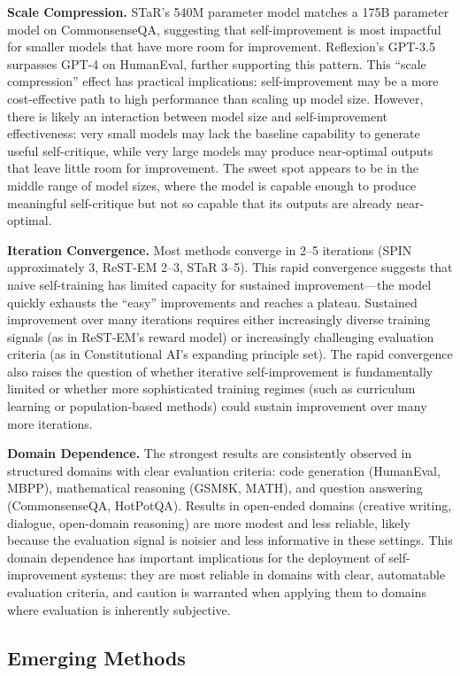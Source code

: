 \textbf{Scale Compression.} STaR's 540M parameter model matches a 175B parameter model on CommonsenseQA, suggesting that self-improvement is most impactful for smaller models that have more room for improvement. Reflexion's GPT-3.5 surpasses GPT-4 on HumanEval, further supporting this pattern. This ``scale compression'' effect has practical implications: self-improvement may be a more cost-effective path to high performance than scaling up model size. However, there is likely an interaction between model size and self-improvement effectiveness: very small models may lack the baseline capability to generate useful self-critique, while very large models may produce near-optimal outputs that leave little room for improvement. The sweet spot appears to be in the middle range of model sizes, where the model is capable enough to produce meaningful self-critique but not so capable that its outputs are already near-optimal.

\textbf{Iteration Convergence.} Most methods converge in 2--5 iterations (SPIN approximately 3, ReST-EM 2--3, STaR 3--5). This rapid convergence suggests that naive self-training has limited capacity for sustained improvement---the model quickly exhausts the ``easy'' improvements and reaches a plateau. Sustained improvement over many iterations requires either increasingly diverse training signals (as in ReST-EM's reward model) or increasingly challenging evaluation criteria (as in Constitutional AI's expanding principle set). The rapid convergence also raises the question of whether iterative self-improvement is fundamentally limited or whether more sophisticated training regimes (such as curriculum learning or population-based methods) could sustain improvement over many more iterations.

\textbf{Domain Dependence.} The strongest results are consistently observed in structured domains with clear evaluation criteria: code generation (HumanEval, MBPP), mathematical reasoning (GSM8K, MATH), and question answering (CommonsenseQA, HotPotQA). Results in open-ended domains (creative writing, dialogue, open-domain reasoning) are more modest and less reliable, likely because the evaluation signal is noisier and less informative in these settings. This domain dependence has important implications for the deployment of self-improvement systems: they are most reliable in domains with clear, automatable evaluation criteria, and caution is warranted when applying them to domains where evaluation is inherently subjective.


\subsection{Emerging Methods}
\label{sec:emerging-methods}

